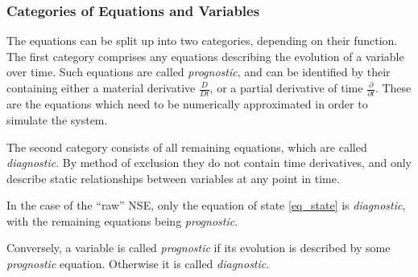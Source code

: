 \subsubsection{Categories of Equations and Variables}
The equations can be split up into two categories, depending on their function.
The first category comprises any equations describing the evolution of a variable over time.
Such equations are called \emph{prognostic}, and can be identified by their containing either a material derivative $\frac{D}{Dt}$, or a partial derivative of time $\frac{\partial}{\partial t}$.
These are the equations which need to be numerically approximated in order to simulate the system.

The second category consists of all remaining equations, which are called \emph{diagnostic}.
By method of exclusion they do not contain time derivatives, and only describe static relationships between variables at any point in time.

In the case of the ``raw'' NSE, only the equation of state \ref{eq_state} is \emph{diagnostic}, with the remaining equations being \emph{prognostic}.

Conversely, a variable is called \emph{prognostic} if its evolution is described by some \emph{prognostic} equation.
Otherwise it is called \emph{diagnostic}.

